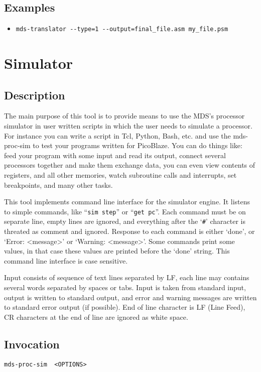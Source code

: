     \subsection{Examples}
        \begin{itemize}
            \item \verb'mds-translator --type=1 --output=final_file.asm my_file.psm'\\
        \end{itemize}

\clearpage
\section{Simulator}
    \subsection{Description}
        The main purpose of this tool is to provide means to use the MDS's processor simulator in user written scripts in which the user needs to simulate a processor. For instance you can write a script in Tcl, Python, Bash, etc. and use the mds-proc-sim to test your programs written for PicoBlaze. You can do things like: feed your program with some input and read its output, connect several processors together and make them exchange data, you can even view contents of registers, and all other memories, watch subroutine calls and interrupts, set breakpoints, and many other tasks.

        This tool implements command line interface for the simulator engine. It listens to simple commands, like ``\texttt{sim~step}'' or ``\texttt{get~pc}''. Each command must be on separate line, empty lines are ignored, and everything after the `\texttt{\#}' character is threated as comment and ignored. Response to each command is either `done', or `Error: <message>' or `Warning: <message>'. Some commands print some values, in that case these values are printed before the `done' string. This command line interface is case sensitive.

        Input consists of sequence of text lines separated by LF, each line may contains several words separated by spaces or tabs. Input is taken from standard input, output is written to standard output, and error and warning messages are written to standard error output (if possible). End of line character is LF (Line Feed), CR characters at the end of line are ignored as white space.

    \subsection{Invocation}
        \verb'mds-proc-sim  <OPTIONS>'

